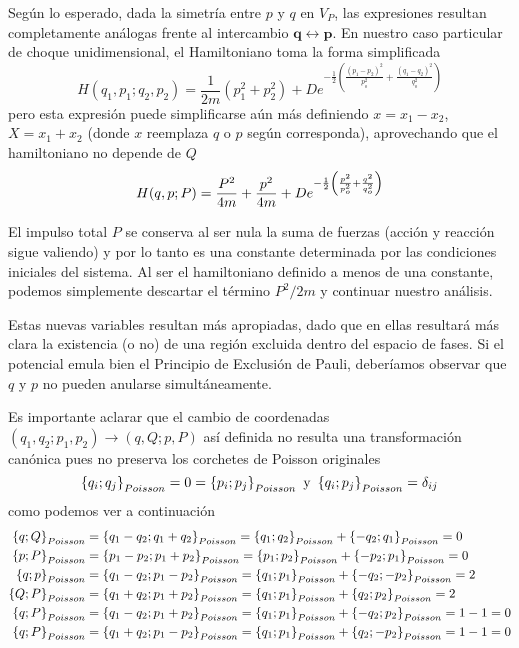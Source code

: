 Según lo esperado, dada la simetría entre $p$ y $q$ en $V_P$, las expresiones resultan completamente análogas frente al intercambio $\mathbf{q}\leftrightarrow\mathbf{p}$.
En nuestro caso particular de choque unidimensional, el Hamiltoniano toma la forma simplificada
\[ H(q_1, p_1; q_2, p_2) = \frac{1}{2m}\left( p_1^2 +p_2^2\right) + De^{-\frac{1}{2}\left(\frac{(p_1-p_2)^2}{p_o^2} + \frac{(q_1 - q_2)^2}{q_o^2}\right)} \]
pero esta expresión puede simplificarse aún más definiendo $x = x_1 - x_2$, $X = x_1 + x_2$ (donde $x$ reemplaza $q$ o $p$ según corresponda), aprovechando que el hamiltoniano no depende de $Q$
\begin{equation}{\label{eq:hamiltoniano_1D}}
H(q, p; P) = \frac{P^2}{4m} +\frac{p^2}{4m} + De^{-\frac{1}{2}\left(\frac{p^2}{p_o^2} + \frac{q^2}{q_o^2}\right)}
\end{equation}

El impulso total $P$ se conserva al ser nula la suma de fuerzas (acción y reacción sigue valiendo) y por lo tanto es una constante determinada por las condiciones iniciales del sistema.
Al ser el hamiltoniano definido a menos de una constante, podemos simplemente descartar el término $P^2/2m$ y continuar nuestro análisis.

Estas nuevas variables resultan más apropiadas, dado que en ellas resultará más clara la existencia (o no) de una región excluida dentro del espacio de fases.
Si el potencial emula bien el Principio de Exclusión de Pauli, deberíamos observar que $q$ y $p$ no pueden anularse simultáneamente.

Es importante aclarar que el cambio de coordenadas $(q_1,q_2;p_1,p_2)\rightarrow (q,Q;p,P)$ así definida no resulta una transformación canónica pues no preserva los corchetes de Poisson originales 
\[ \left\{q_i; q_j \right\}_{Poisson} = 0 = \left\{p_i; p_j \right\}_{Poisson} \text{ y } \left\{q_i; p_j \right\}_{Poisson} = \delta_{ij} \]
como podemos ver a continuación
\begin{align*}
\left\{q; Q \right\}_{Poisson} &= \left\{q_1-q_2; q_1+q_2 \right\}_{Poisson} =  \left\{q_1; q_2 \right\}_{Poisson} + \left\{-q_2; q_1 \right\}_{Poisson} = 0 \\
\left\{p; P \right\}_{Poisson} &= \left\{p_1-p_2; p_1+p_2 \right\}_{Poisson} = \left\{p_1; p_2 \right\}_{Poisson} + \left\{-p_2; p_1 \right\}_{Poisson} = 0 \\
\left\{q; p \right\}_{Poisson} &= \left\{q_1-q_2; p_1-p_2 \right\}_{Poisson} =  \left\{q_1; p_1 \right\}_{Poisson} + \left\{-q_2; -p_2 \right\}_{Poisson} = 2 \\
\left\{Q; P \right\}_{Poisson} &= \left\{q_1+q_2; p_1+p_2 \right\}_{Poisson} =  \left\{q_1; p_1 \right\}_{Poisson} + \left\{q_2; p_2 \right\}_{Poisson} = 2 \\
\left\{q; P \right\}_{Poisson} &= \left\{q_1-q_2; p_1+p_2 \right\}_{Poisson} = \left\{q_1; p_1 \right\}_{Poisson} + \left\{-q_2; p_2 \right\}_{Poisson} = 1 - 1 = 0 \\
\left\{q; P \right\}_{Poisson} &= \left\{q_1+q_2; p_1-p_2 \right\}_{Poisson} = \left\{q_1; p_1 \right\}_{Poisson} + \left\{q_2; -p_2 \right\}_{Poisson} = 1 - 1 = 0
\end{align*}

